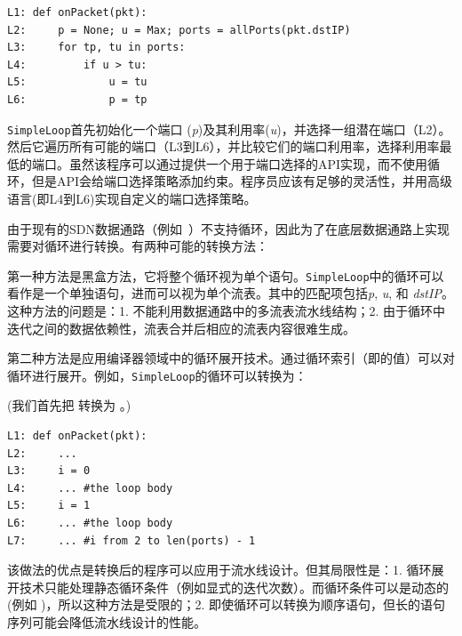 \begin{small}
\begin{verbatim}
L1: def onPacket(pkt):
L2:     p = None; u = Max; ports = allPorts(pkt.dstIP)
L3:     for tp, tu in ports:
L4:         if u > tu:
L5:             u = tu
L6:             p = tp
\end{verbatim}
\end{small}

\texttt{SimpleLoop}首先初始化一个端口 (\emph{p})及其利用率(\emph{u})，并选择一组潜在端口（L2）。然后它遍历所有可能的端口（L3到L6），并比较它们的端口利用率，选择利用率最低的端口。虽然该程序可以通过提供一个用于端口选择的API实现，而不使用循环，但是API会给端口选择策略添加约束。程序员应该有足够的灵活性，并用高级语言(即L4到L6)实现自定义的端口选择策略。 

由于现有的SDN数据通路（例如~\cite{OF-DPA}）不支持循环，因此为了在底层数据通路上实现需要对循环进行转换。有两种可能的转换方法：

第一种方法是黑盒方法，它将整个循环视为单个语句。\texttt{SimpleLoop}中的循环可以看作是一个单独语句，进而可以视为单个流表。其中的匹配项包括\emph{p}, \emph{u}, 和 \emph{dstIP}。这种方法的问题是：1. 不能利用数据通路中的多流表流水线结构；2. 由于循环中迭代之间的数据依赖性，流表合并后相应的流表内容很难生成。

第二种方法是应用编译器领域中的循环展开技术。通过循环索引（即的值）可以对循环进行展开。例如，\texttt{SimpleLoop}的循环可以转换为：

(我们首先把  转换为 。)

\begin{small}
\begin{verbatim}
L1: def onPacket(pkt):
L2:     ... 
L3:     i = 0
L4:     ... #the loop body
L5:     i = 1
L6:     ... #the loop body
L7:     ... #i from 2 to len(ports) - 1
\end{verbatim}
\end{small}

该做法的优点是转换后的程序可以应用于流水线设计。但其局限性是：1. 循环展开技术只能处理静态循环条件（例如显式的迭代次数）。而循环条件可以是动态的(例如 )，所以这种方法是受限的；2. 即使循环可以转换为顺序语句，但长的语句序列可能会降低流水线设计的性能。

